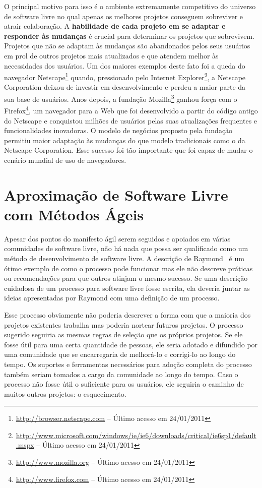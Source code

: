 O principal motivo para isso é o ambiente extremamente competitivo do
universo de software livre no qual apenas os melhores projetos
conseguem sobreviver e atrair colaboração. A \textbf{habilidade de
  cada projeto em se adaptar e responder às mudanças} é crucial para
determinar os projetos que sobrevivem.  Projetos que não se adaptam às
mudanças são abandonados pelos seus usuários em prol de outros
projetos mais atualizados e que atendem melhor às necessidades dos
usuários.  Um dos maiores exemplos deste fato foi a queda do navegador
Netscape\footnote{\url{http://browser.netscape.com} -- Último acesso
  em 24/01/2011} quando, pressionado pelo Internet
Explorer\footnote{\url{http://www.microsoft.com/windows/ie/ie6/downloads/critical/ie6sp1/default.mspx}
  -- Último acesso em 24/01/2011}, a Netscape Corporation deixou de
investir em desenvolvimento e perdeu a maior parte da sua base de
usuários. Anos depois, a fundação
Mozilla\footnote{\url{http://www.mozilla.org} -- Último acesso em
  24/01/2011} ganhou força com o
Firefox\footnote{\url{http://www.firefox.com} -- Último acesso em
  24/01/2011}, um navegador para a Web que foi desenvolvido a partir
do código antigo do Netscape e conquistou milhões de usuários pelas
suas atualizações frequentes e funcionalidades inovadoras. O modelo de
negócios proposto pela fundação permitiu maior adaptação às mudanças
do que modelo tradicionais como o da Netscape Corporation. Esse
sucesso foi tão importante que foi capaz de mudar o cenário mundial de
uso de navegadores.

\section{Aproximação de Software Livre com Métodos Ágeis}
\label{sec:agile?}

Apesar dos pontos do manifesto ágil serem seguidos e apoiados em
várias comunidades de software livre, não há nada que possa ser
qualificado como um método de desenvolvimento de software livre. A
descrição de Raymond~\cite{Raymond1999} é um ótimo exemplo de como o
processo pode funcionar mas ele não descreve práticas ou recomendações
para que outros atinjam o mesmo sucesso. Se uma descrição cuidadosa de
um processo para software livre fosse escrita, ela deveria juntar as
ideias apresentadas por Raymond com uma definição de um processo.


Esse processo obviamente não poderia descrever a forma com que a
maioria dos projetos existentes trabalha mas poderia nortear futuros
projetos. O processo sugerido seguiria as mesmas regras de seleção que
os próprios projetos. Se ele fosse útil para uma certa quantidade de
pessoas, ele seria adotado e difundido por uma comunidade que se
encarregaria de melhorá-lo e corrigi-lo ao longo do tempo. Os suportes
e ferramentas necessários para adoção completa do processo também
seriam tomados a cargo da comunidade ao longo do tempo. Caso o
processo não fosse útil o suficiente para os usuários, ele seguiria o
caminho de muitos outros projetos: o esquecimento.

